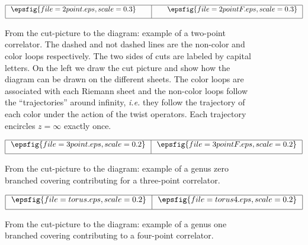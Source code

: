 \documentclass[letterpaper]{JHEP3}
\begin{document}
\begin{figure}[htbp]
 \begin{center}
$\begin{array}{|@{\hspace{0.1in}}c@{\hspace{0.3in}}|@{\hspace{0.3in}}c@{\hspace{0.1in}}|}
\hline
\epsfig{file=2point.eps,scale=0.3} &    \epsfig{file=2pointF.eps,scale=0.3}
\\ [0.2cm]
\hline
\end{array}$
\caption{From the cut-picture to the diagram: example of a two-point correlator. 
The dashed and not dashed lines are the non-color and color loops respectively.
The two sides of cuts are labeled by capital letters. On the left we draw the cut picture and
show how  the diagram can be drawn on the different sheets. The color loops are associated
with each Riemann sheet and the non-color loops follow the ``trajectories'' around infinity, {\it i.e.} they follow
the trajectory of each color under the action of the twist operators.
Each trajectory encircles $z=\infty$ exactly once.  } \label{2p}
\end{center}
\end{figure}
\begin{figure}[htbp]
 \begin{center}
$\begin{array}{|@{\hspace{0.1in}}c@{\hspace{0.1in}}|@{\hspace{0.1in}}c@{\hspace{0.1in}}|}
\hline
\epsfig{file=3point.eps,scale=0.2} &    \epsfig{file=3pointF.eps,scale=0.2}
\\ [0.2cm]
\hline
\end{array}$
\caption{From the cut-picture to the diagram: example of  a genus zero branched covering contributing for a three-point correlator.} \label{3p}
\end{center}
\end{figure}
\begin{figure}[htbp]
 \begin{center}
$\begin{array}{|@{\hspace{0.1in}}c@{\hspace{0.1in}}|@{\hspace{0.1in}}c@{\hspace{0.1in}}|}
\hline
\epsfig{file=torus.eps,scale=0.2} &    \epsfig{file=torus4.eps,scale=0.2}
\\ [0.2cm]
\hline
\end{array}$
\caption{From the cut-picture to the diagram: example of a genus one branched covering contributing to  a four-point correlator.} \label{4p}
\end{center}
\end{figure}
\end{document}

